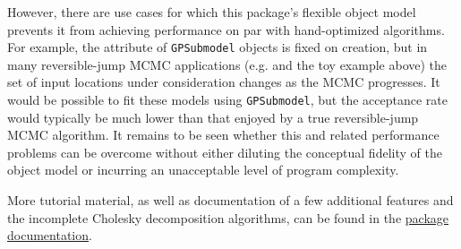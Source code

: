\documentclass[article]{jss}
\begin{document}
However, there are use cases for which this package's flexible object model prevents it from achieving performance on par with hand-optimized algorithms. For example, the  attribute of \texttt{GPSubmodel} objects is fixed on creation, but in many reversible-jump MCMC applications (e.g. \cite{gramacy} and the toy example above) the set of input locations under consideration changes as the MCMC progresses. It would be possible to fit these models using \texttt{GPSubmodel}, but the acceptance rate would typically be much lower than that enjoyed by a true reversible-jump MCMC algorithm. It remains to be seen whether this and related performance problems can be overcome without either diluting the conceptual fidelity of the object model or incurring an unacceptable level of program complexity.

More tutorial material, as well as documentation of a few additional features and the incomplete Cholesky decomposition algorithms, can be found in the \href{http://pymc.googlecode.com/files/GPUserGuide.pdf}{package documentation}.


\end{document}
